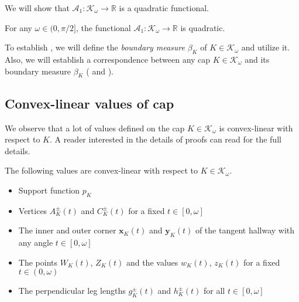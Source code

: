 We will show that \(\mathcal{A}_1 : \mathcal{K}_\omega \to \mathbb{R}\) is a quadratic functional.

\begin{theorem}

For any \(\omega \in (0, \pi/2]\), the functional \(\mathcal{A}_1 : \mathcal{K}_{\omega} \to \mathbb{R}\) is quadratic.

\label{thm:a1-quadratic}
\end{theorem}

To establish , we will define the \emph{boundary measure} \(\beta_K\) of \(K \in \mathcal{K}_\omega\) and utilize it. Also, we will establish a correspondence between any cap \(K \in \mathcal{K}_\omega\) and its boundary measure \(\beta_K\) ( and ).

\subsection{Convex-linear values of cap}

We observe that a lot of values defined on the cap \(K \in \mathcal{K}_\omega\) is convex-linear with respect to \(K\). A reader interested in the details of proofs can read  for the full details.

\begin{theorem}

The following values are convex-linear with respect to \(K \in \mathcal{K}_\omega\).

\begin{itemize}
\tightlist
\item
  Support function \(p_K\)
\item
  Vertices \(A^{\pm}_K(t)\) and \(C^{\pm}_K(t)\) for a fixed \(t \in [0, \omega]\)
\item
  The inner and outer corner \(\mathbf{x}_K(t)\) and \(\mathbf{y}_K(t)\) of the tangent hallway with any angle \(t \in [0, \omega]\)
\item
  The points \(W_K(t)\), \(Z_K(t)\) and the values \(w_K(t)\), \(z_K(t)\) for a fixed \(t \in (0, \omega)\)
\item
  The perpendicular leg lengths \(g^{\pm}_K(t)\) and \(h^{\pm}_K(t)\) for all \(t \in [0, \omega]\)
\end{itemize}

\label{thm:cap-convex-linear}
\end{theorem}

